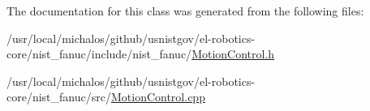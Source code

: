 The documentation for this class was generated from the following files\-:\begin{DoxyCompactItemize}
\item 
/usr/local/michalos/github/usnistgov/el-\/robotics-\/core/nist\-\_\-fanuc/include/nist\-\_\-fanuc/\hyperlink{MotionControl_8h}{Motion\-Control.\-h}\item 
/usr/local/michalos/github/usnistgov/el-\/robotics-\/core/nist\-\_\-fanuc/src/\hyperlink{MotionControl_8cpp}{Motion\-Control.\-cpp}\end{DoxyCompactItemize}
